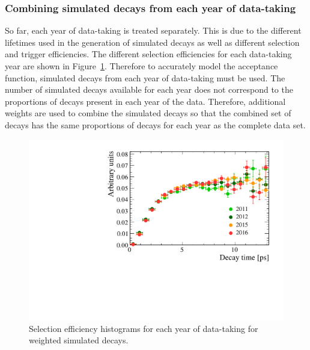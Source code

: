 \clearpage

\subsubsection*{Combining \boldmath{\bsmumu} simulated decays from each year of data-taking}


So far, each year of data-taking is treated separately. This is due to the different \bs lifetimes used in the generation of simulated decays as well as different selection and trigger efficiencies. The different selection efficiencies for each data-taking year are shown in Figure~\ref{fig:accptplotyrs}. Therefore to accurately model the \bsmumu acceptance function, simulated decays from each year of data-taking must be used. The number of simulated decays available for each year does not correspond to the proportions of decays present in each year of the data. Therefore, additional weights are used to combine the simulated decays so that the combined set of decays has the same proportions of decays for each year as the complete data set. 


\begin{figure}[btp]
    \centering
        \includegraphics[width= 0.8 \textwidth]{./Figs/LifetimeMeasurement/Acceptance_per_year.pdf}
    \caption{Selection efficiency histograms for each year of data-taking for weighted simulated \bsmumu decays. }
    \label{fig:accptplotyrs}
\end{figure}


